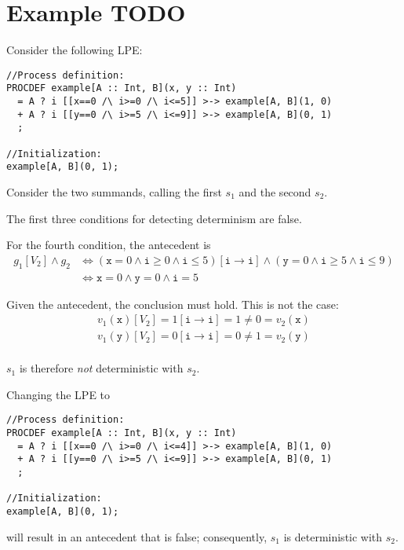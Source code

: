 \section{Example TODO}

Consider the following LPE:

\begin{lstlisting}
//Process definition:
PROCDEF example[A :: Int, B](x, y :: Int)
  = A ? i [[x==0 /\ i>=0 /\ i<=5]] >-> example[A, B](1, 0)
  + A ? i [[y==0 /\ i>=5 /\ i<=9]] >-> example[A, B](0, 1)
  ;

//Initialization:
example[A, B](0, 1);
\end{lstlisting}

Consider the two summands, calling the first $s_1$ and the second $s_2$.

The first three conditions for detecting determinism are false.

For the fourth condition, the antecedent is
\begin{align*}
g_1[V_2] \land g_2 &\Leftrightarrow (\texttt{x} = 0 \land \texttt{i} \geq 0 \land \texttt{i} \leq 5)[\texttt{i} \rightarrow \texttt{i}] \land (\texttt{y} = 0 \land \texttt{i} \geq 5 \land \texttt{i} \leq 9) \\
&\Leftrightarrow \texttt{x} = 0 \land \texttt{y} = 0 \land \texttt{i} = 5
\end{align*}

Given the antecedent, the conclusion must hold.
This is not the case:
\begin{align*}
v_1(\texttt{x})[V_2] = 1[\texttt{i} \rightarrow \texttt{i}] = 1 \neq 0 = v_2(\texttt{x}) \\
v_1(\texttt{y})[V_2] = 0[\texttt{i} \rightarrow \texttt{i}] = 0 \neq 1 = v_2(\texttt{y}) \\
\end{align*}

$s_1$ is therefore \emph{not} deterministic with $s_2$.

Changing the LPE to

\begin{lstlisting}
//Process definition:
PROCDEF example[A :: Int, B](x, y :: Int)
  = A ? i [[x==0 /\ i>=0 /\ i<=4]] >-> example[A, B](1, 0)
  + A ? i [[y==0 /\ i>=5 /\ i<=9]] >-> example[A, B](0, 1)
  ;

//Initialization:
example[A, B](0, 1);
\end{lstlisting}

will result in an antecedent that is false; consequently, $s_1$ is deterministic with $s_2$.

